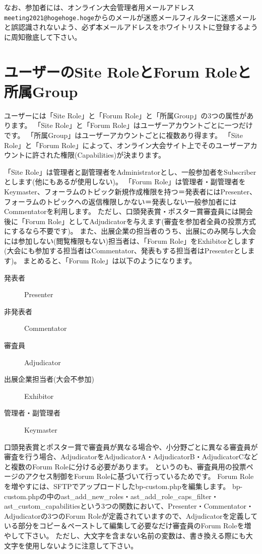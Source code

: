 \documentclass[titlepage,10pt,a4paper,uplatex]{jsbook}
\begin{document}
なお、参加者には、オンライン大会管理者用メールアドレス\texttt{meeting2021@hogehoge.hoge}からのメールが迷惑メールフィルターに迷惑メールと誤認識されないよう、必ず本メールアドレスをホワイトリストに登録するように周知徹底して下さい。

\section{ユーザーのSite RoleとForum Roleと所属Group}

ユーザーには「Site Role」と「Forum Role」と「所属Group」の3つの属性があります。
「Site Role」と「Forum Role」はユーザーアカウントごとに一つだけです。
「所属Group」はユーザーアカウントごとに複数あり得ます。
「Site Role」と「Forum Role」によって、オンライン大会サイト上でそのユーザーアカウントに許された権限(Capabilities)が決まります。

「Site Role」は管理者と副管理者をAdministratorとし、一般参加者をSubscriberとします(他にもあるが使用しない)。
「Forum Role」は管理者・副管理者をKeymaster、フォーラムのトピック新規作成権限を持つ＝発表者にはPresenter、フォーラムのトピックへの返信権限しかない＝発表しない一般参加者にはCommentatorを利用します。
ただし、口頭発表賞・ポスター賞審査員には開会後に「Forum Role」としてAdjudicatorを与えます(審査を参加者全員の投票方式にするなら不要です)。
また、出展企業の担当者のうち、出展にのみ関与し大会には参加しない(閲覧権限もない)担当者は、「Forum Role」をExhibitorとします(大会にも参加する担当者はCommentator、発表もする担当者はPresenterとします)。
まとめると、「Forum Role」は以下のようになります。

\begin{description}
\item[発表者] Presenter
\item[非発表者] Commentator
\item[審査員] Adjudicator
\item[出展企業担当者(大会不参加)] Exhibitor
\item[管理者・副管理者] Keymaster
\end{description}

口頭発表賞とポスター賞で審査員が異なる場合や、小分野ごとに異なる審査員が審査を行う場合、AdjudicatorをAdjudicatorA・AdjudicatorB・AdjudicatorCなどと複数のForum Roleに分ける必要があります。
というのも、審査員用の投票ページのアクセス制御をForum Roleに基づいて行っているためです。
Forum Roleを増やすには、SFTPでアップロードしたbp-custom.phpを編集します。
bp-custom.phpの中のast\_add\_new\_roles・ast\_add\_role\_caps\_filter・ast\_custom\_capabilitiesという3つの関数において、Presenter・Commentator・Adjudicatorの3つのForum Roleが定義されていますので、Adjudicatorを定義している部分をコピー＆ペーストして編集して必要なだけ審査員のForum Roleを増やして下さい。
ただし、大文字を含まない名前の変数は、書き換える際にも大文字を使用しないように注意して下さい。
\end{document}
